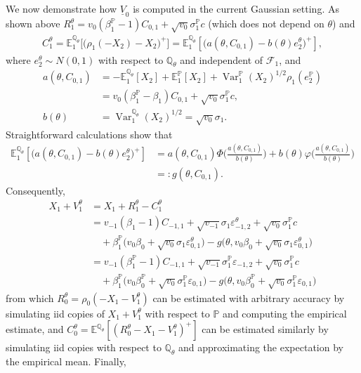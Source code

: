 \documentclass[11pt,a4paper]{article}
\newcommand{\E}{\mathbb{E}}
\renewcommand{\P}{\mathbb{P}}
\newcommand{\Q}{\mathbb{Q}}
\newcommand{\Var}{\operatorname{Var}}
\renewcommand{\phi}{\varphi}
\newcommand{\calF}{\mathcal{F}}
\begin{document}
We now demonstrate how $\underline{V}_0$ is computed in the current Gaussian setting. As shown above $R_1^{\theta}=v_0(\beta_1^{\P}-1)C_{0,1}+\sqrt{v_0}\sigma_1^{\P}c$ (which does not depend on $\theta$) and 
\begin{align*}
C_1^{\theta}=\E^{\Q_{\theta}}_1\big[\big(\rho_1(-X_{2})-X_{2}\big)^+\big]
=\E^{\Q_{\theta}}_1[\big(a(\theta,C_{0,1})-b(\theta)e^{\theta}_{2}\big)^+], 
\end{align*}
where $e^{\theta}_{2}\sim N(0,1)$ with respect to $\Q_{\theta}$ and independent of $\calF_1$, and 
\begin{align*}
a(\theta,C_{0,1})&=-\E^{\Q_{\theta}}_1[X_{2}]+\E^\P_1[X_{2}]+\Var^\P_1(X_{2})^{1/2} \rho_1(e^\P_{2})\\
&=v_0(\beta_1^{\P}-\beta_1)C_{0,1}+\sqrt{v_0}\sigma_1^{\P}c, \\
b(\theta)&=\Var^{\Q_{\theta}}_1(X_{2})^{1/2} = \sqrt{v_0}\sigma_1. 
\end{align*} 
Straightforward calculations show that 
\begin{align*}
\E^{\Q_{\theta}}_1[\big(a(\theta,C_{0,1})-b(\theta)e^{\theta}_{2}\big)^+]
&=a(\theta,C_{0,1})\Phi\bigg(\frac{a(\theta,C_{0,1})}{b(\theta)}\bigg)+b(\theta)\phi\bigg(\frac{a(\theta,C_{0,1})}{b(\theta)}\bigg)\\
&=:g(\theta,C_{0,1}).
\end{align*}
Consequently, 
\begin{align*}
X_1+V_1^{\theta}&=X_1+R_1^{\theta}-C_1^{\theta}\\
&=v_{-1}(\beta_1-1)C_{-1,1}+\sqrt{v_{-1}}\sigma_1\varepsilon_{-1,2}^{\theta}+\sqrt{v_0}\sigma_1^{\P}c\\
&\quad+\beta_1^{\P}\bigg(v_0\beta_0+\sqrt{v_0}\sigma_1\varepsilon_{0,1}^{\theta}\bigg)
-g\bigg(\theta,v_0\beta_0+\sqrt{v_0}\sigma_1\varepsilon_{0,1}^{\theta}\bigg)\\
&=v_{-1}(\beta_1^{\P}-1)C_{-1,1}+\sqrt{v_{-1}}\sigma_1^{\P}\varepsilon_{-1,2}+\sqrt{v_0}\sigma_1^{\P}c\\
&\quad+\beta_1^{\P}\bigg(v_0\beta_0^{\P}+\sqrt{v_0}\sigma_1^{\P}\varepsilon_{0,1}\bigg)
-g\bigg(\theta,v_0\beta_0^{\P}+\sqrt{v_0}\sigma_1^{\P}\varepsilon_{0,1}\bigg)
\end{align*}
from which $R_0^{\theta}=\rho_0(-X_1-V_1^{\theta})$ can be estimated with arbitrary accuracy by simulating iid copies of $X_1+V_1^{\theta}$ with respect to $\P$ and computing the empirical estimate, and $C_0^{\theta}=\E^{\Q_{\theta}}[(R_0^{\theta}-X_1-V_1^{\theta})^{+}]$ can be estimated similarly by simulating iid copies with respect to $\Q_{\theta}$ and approximating the expectation by the empirical mean. Finally, 
\end{document}

